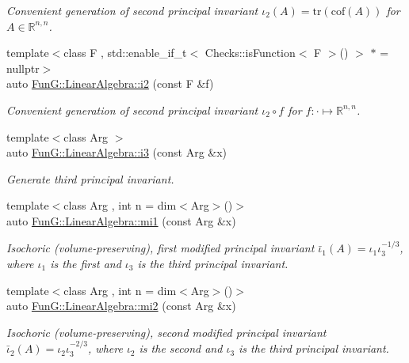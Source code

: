 \begin{DoxyCompactItemize}
\begin{DoxyCompactList}\small\item\em \-Convenient generation of second principal invariant $ \iota_2(A)=\mathrm{tr}(\mathrm{cof}(A)) $ for $A\in\mathbb{R}^{n,n}$. \end{DoxyCompactList}\item 
{\footnotesize template$<$class F , std\-::enable\-\_\-if\-\_\-t$<$ Checks\-::is\-Function$<$ F $>$() $>$ $\ast$  = nullptr$>$ }\\auto \hyperlink{group__InvariantGroup_gad3987f97353c8696e602ed1915b3cf47}{\-Fun\-G\-::\-Linear\-Algebra\-::i2} (const \-F \&f)
\begin{DoxyCompactList}\small\item\em \-Convenient generation of second principal invariant $ \iota_2\circ f $ for $f:\cdot\mapsto\mathbb{R}^{n,n}$. \end{DoxyCompactList}\item 
{\footnotesize template$<$class Arg $>$ }\\auto \hyperlink{group__InvariantGroup_gae1ad80b4b2f34a10564114fad28bc313}{\-Fun\-G\-::\-Linear\-Algebra\-::i3} (const \-Arg \&x)
\begin{DoxyCompactList}\small\item\em \-Generate third principal invariant. \end{DoxyCompactList}\item 
{\footnotesize template$<$class Arg , int n = dim$<$\-Arg$>$()$>$ }\\auto \hyperlink{group__InvariantGroup_ga7eed5e2661171d81e192ac1db791244c}{\-Fun\-G\-::\-Linear\-Algebra\-::mi1} (const \-Arg \&x)
\begin{DoxyCompactList}\small\item\em \-Isochoric (volume-\/preserving), first modified principal invariant $ \bar\iota_1(A)=\iota_1\iota_3^{-1/3} $, where $\iota_1$ is the first and $\iota_3$ is the third principal invariant. \end{DoxyCompactList}\item 
{\footnotesize template$<$class Arg , int n = dim$<$\-Arg$>$()$>$ }\\auto \hyperlink{group__InvariantGroup_ga9d219c5c48cce1d3af60345916963524}{\-Fun\-G\-::\-Linear\-Algebra\-::mi2} (const \-Arg \&x)
\begin{DoxyCompactList}\small\item\em \-Isochoric (volume-\/preserving), second modified principal invariant $ \bar\iota_2(A)=\iota_2\iota_3^{-2/3} $, where $\iota_2$ is the second and $\iota_3$ is the third principal invariant. \end{DoxyCompactList}\end{DoxyCompactItemize}


